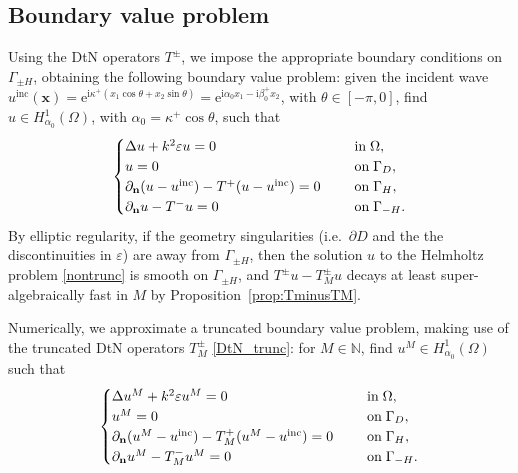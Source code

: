 \documentclass[a4paper,10pt]{article}
\newcommand{\IN}{{\mathbb N}}
\newcommand{\bx}{{\mathbf x}}
\newcommand{\bn}{{\mathbf n}}
\newcommand{\ri}{{\mathrm i}}
\newcommand{\re}{{\mathrm e}}
\newcommand{\inc}{{\mathrm{inc}}}
\newcommand{\dn}{{\partial_\bn}}
\newcommand{\GD}{{\Gamma_D}}
\newcommand{\GH}{{\Gamma_H}}
\newcommand{\GmH}{{\Gamma_{-H}}}
\newcommand{\GpmH}{{\Gamma_{\pm H}}}
\begin{document}
\subsection{Boundary value problem}

Using the DtN operators $T^\pm$, we impose the appropriate boundary conditions on $\GpmH$, obtaining the following boundary value problem: given the incident wave 
$u^\inc(\bx) = \re^{\ri \kappa^+(x_1\cos \theta + x_2\sin \theta)} 
= \re^{\ri\alpha_0 x_1 - \ri \beta_0^+ x_2}$,
with $\theta \in \left[-\pi, 0 \right]$, find $u \in H^1_{\alpha_0}(\Omega)$, with $\alpha_0 = \kappa^+ \cos \theta$, such that
\begin{equation} \label{nontrunc}
\begin{cases}
	\Delta u + k^2\varepsilon u = 0 & \hspace{0.5cm} \text{in} \; \Omega, \\
	u = 0 & \hspace{0.5cm} \text{on} \; \GD, \\
	\dn(u-u^\inc) - T^+(u-u^\inc) = 0 & \hspace{0.5cm} \text{on} \; \GH, \\
	\dn u - T^-u = 0 & \hspace{0.5cm} \text{on} \; \GmH.
\end{cases}
\end{equation}
By elliptic regularity, if the geometry singularities (i.e.\ $\partial D$ and the the discontinuities in $\varepsilon$) are away from $\GpmH$, then the solution $u$ to the Helmholtz problem \eqref{nontrunc} is smooth on $\GpmH$, and $T^\pm u-T^\pm_M u$ decays at least super-algebraically fast in $M$ by Proposition~\ref{prop:TminusTM}.

Numerically, we approximate a truncated boundary value problem, making use of the truncated DtN operators $T^\pm_M$ \eqref{DtN_trunc}: for $M\in\IN$, find $u^M \in H^1_{\alpha_0}(\Omega)$ such that
\begin{equation} \label{trunc}
\begin{cases}
	\Delta {u^M} + k^2\varepsilon {u^M} = 0 & \hspace{0.5cm} \text{in} \; \Omega, \\
	{u^M} = 0 & \hspace{0.5cm} \text{on} \; \GD, \\
	\dn ({u^M}-u^\inc) - T_M^+({u^M}-u^\inc) = 0 & \hspace{0.5cm} \text{on} \; \GH, \\
	\dn {u^M} - T_M^-{u^M} = 0 & \hspace{0.5cm} \text{on} \; \GmH.
\end{cases}
\end{equation}
\end{document}
